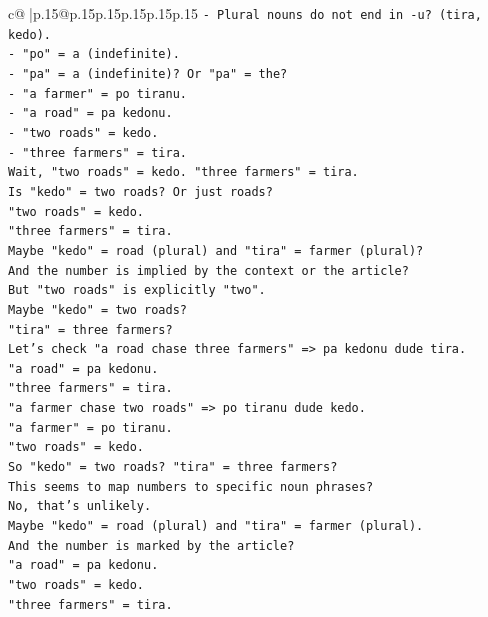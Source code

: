 \documentclass{article}
\begin{document}
{\begin{supertabular}{c@{$\;$}|p{.15\linewidth}@{}p{.15\linewidth}p{.15\linewidth}p{.15\linewidth}p{.15\linewidth}p{.15\linewidth}}
{{{\texttt{{-} Plural nouns do not end in {-}u? (tira, kedo).} \\
\texttt{{-} "po" = a (indefinite).} \\
\texttt{{-} "pa" = a (indefinite)? Or "pa" = the?} \\
\texttt{{-} "a farmer" = po tiranu.} \\
\texttt{{-} "a road" = pa kedonu.} \\
\texttt{{-} "two roads" = kedo.} \\
\texttt{{-} "three farmers" = tira.} \\
\texttt{Wait, "two roads" = kedo. "three farmers" = tira.} \\
\texttt{Is "kedo" = two roads? Or just roads?} \\
\texttt{"two roads" = kedo.} \\
\texttt{"three farmers" = tira.} \\
\texttt{Maybe "kedo" = road (plural) and "tira" = farmer (plural)?} \\
\texttt{And the number is implied by the context or the article?} \\
\texttt{But "two roads" is explicitly "two".} \\
\texttt{Maybe "kedo" = two roads?} \\
\texttt{"tira" = three farmers?} \\
\texttt{Let's check "a road chase three farmers" => pa kedonu dude tira.} \\
\texttt{"a road" = pa kedonu.} \\
\texttt{"three farmers" = tira.} \\
\texttt{"a farmer chase two roads" => po tiranu dude kedo.} \\
\texttt{"a farmer" = po tiranu.} \\
\texttt{"two roads" = kedo.} \\
\texttt{So "kedo" = two roads? "tira" = three farmers?} \\
\texttt{This seems to map numbers to specific noun phrases?} \\
\texttt{No, that's unlikely.} \\
\texttt{Maybe "kedo" = road (plural) and "tira" = farmer (plural).} \\
\texttt{And the number is marked by the article?} \\
\texttt{"a road" = pa kedonu.} \\
\texttt{"two roads" = kedo.} \\
\texttt{"three farmers" = tira.} \\
}}}
\end{supertabular}}
\end{document}
